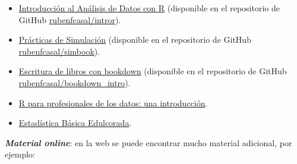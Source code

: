 \documentclass[]{book}
\begin{document}
\begin{itemize}
  \begin{itemize}
  \item
    \href{https://rubenfcasal.github.io/intror}{Introducción al Análisis
    de Datos con R} (disponible en el repositorio de GitHub
    \href{https://github.com/rubenfcasal/intror}{rubenfcasal/intror}).
  \item
    \href{https://rubenfcasal.github.io/simbook}{Prácticas de
    Simulación} (disponible en el repositorio de GitHub
    \href{https://github.com/rubenfcasal/simbook}{rubenfcasal/simbook}).
  \item
    \href{https://rubenfcasal.github.io/bookdown_intro/}{Escritura de
    libros con bookdown} (disponible en el repositorio de GitHub
    \href{https://github.com/rubenfcasal/bookdown_intro}{rubenfcasal/bookdown\_intro}).
  \item
    \href{https://www.datanalytics.com/libro_r/index.html}{R para
    profesionales de los datos: una introducción}.
  \item
    \href{https://bookdown.org/aquintela/EBE}{Estadística Básica
    Edulcorada}.
  \end{itemize}
\end{itemize}

\textbf{\emph{Material online}}: en la web se puede encontrar mucho
material adicional, por ejemplo:
\end{document}
